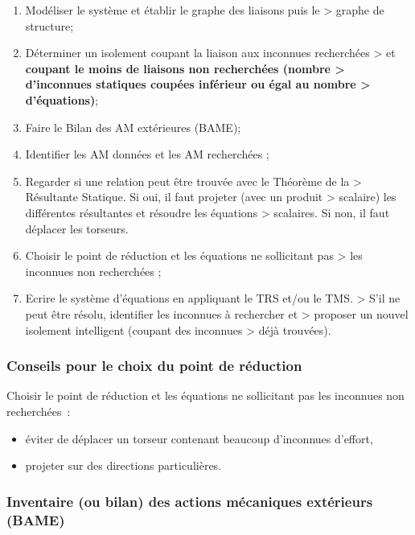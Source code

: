 \begin{enumerate}
\def\labelenumi{\arabic{enumi}.}
\item
  Modéliser le système et établir le graphe des liaisons puis le \textgreater{} graphe de structure;
\item
  Déterminer un isolement coupant la liaison aux inconnues recherchées \textgreater{} et \textbf{coupant le moins de liaisons non recherchées (nombre \textgreater{} d'inconnues statiques coupées inférieur ou égal au nombre \textgreater{} d'équations)};
\item
  Faire le Bilan des AM extérieures (BAME);
\item
  Identifier les AM données et les AM recherchées ;
\item
  Regarder si une relation peut être trouvée avec le Théorème de la \textgreater{} Résultante Statique. Si oui, il faut projeter (avec un produit \textgreater{} scalaire) les différentes résultantes et résoudre les équations \textgreater{} scalaires. Si non, il faut déplacer les torseurs.
\item
  Choisir le point de réduction et les équations ne sollicitant pas \textgreater{} les inconnues non recherchées ;
\item
  Ecrire le système d'équations en appliquant le TRS et/ou le TMS. \textgreater{} S'il ne peut être résolu, identifier les inconnues à rechercher et \textgreater{} proposer un nouvel isolement intelligent (coupant des inconnues \textgreater{} déjà trouvées).
\end{enumerate}

\hypertarget{conseils-pour-le-choix-du-point-de-ruxe9duction}{%
\subsubsection{Conseils pour le choix du point de réduction}\label{conseils-pour-le-choix-du-point-de-ruxe9duction}}

Choisir le point de réduction et les équations ne sollicitant pas les inconnues non recherchées~:

\begin{itemize}
\item
  éviter de déplacer un torseur contenant beaucoup d'inconnues d'effort,
\item
  projeter sur des directions particulières.
\end{itemize}

\hypertarget{inventaire-ou-bilan-des-actions-muxe9caniques-extuxe9rieurs-bame}{%
\subsubsection{Inventaire (ou bilan) des actions mécaniques extérieurs (BAME)}\label{inventaire-ou-bilan-des-actions-muxe9caniques-extuxe9rieurs-bame}}

